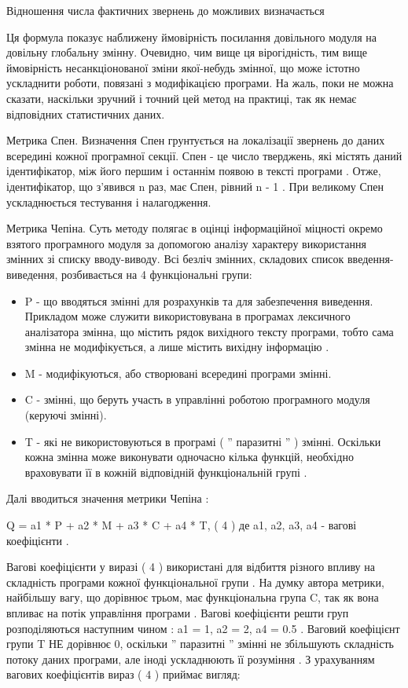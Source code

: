 Відношення числа фактичних звернень до можливих визначається


Ця формула показує наближену ймовірність посилання довільного модуля на довільну глобальну змінну. Очевидно, чим вище ця вірогідність, тим вище ймовірність несанкціонованої зміни якої-небудь змінної, що може істотно ускладнити роботи, пов\dq язані з модифікацією програми. На жаль, поки не можна сказати, наскільки зручний і точний цей метод на практиці, так як немає відповідних статистичних даних.

Метрика Спен.
Визначення Спен грунтується на локалізації звернень до даних всередині кожної програмної секції. Спен - це число тверджень, які містять даний ідентифікатор, між його першим і останнім появою в тексті програми . Отже, ідентифікатор, що з'явився n раз, має Спен, рівний n - 1 . При великому Спен ускладнюється тестування і налагодження.

Метрика Чепіна.
Суть методу полягає в оцінці інформаційної міцності окремо взятого програмного модуля за допомогою аналізу характеру використання змінних зі списку вводу-виводу.
Всі безліч змінних, складових список введення-виведення, розбивається на 4 функціональні групи:

\begin{itemize}
\item P - що вводяться змінні для розрахунків та для забезпечення виведення.
Прикладом може служити використовувана в програмах лексичного аналізатора змінна, що містить рядок вихідного тексту програми, тобто сама змінна не модифікується, а лише містить вихідну інформацію .

\item M - модифікуються, або створювані всередині програми змінні.

\item C - змінні, що беруть участь в управлінні роботою програмного модуля (керуючі змінні).

\item T - які не використовуються в програмі ( '' паразитні '' ) змінні. Оскільки кожна змінна може виконувати одночасно кілька функцій, необхідно враховувати її в кожній відповідній функціональній групі . 
\end{itemize}

Далі вводиться значення метрики Чепіна :

Q = a1 * P + a2 * M + a3 * C + a4 * T, ( 4 )
де a1, a2, a3, a4 - вагові коефіцієнти .

Вагові коефіцієнти у виразі ( 4 ) використані для відбиття різного впливу на складність програми кожної функціональної групи . На думку автора метрики, найбільшу вагу, що дорівнює трьом, має функціональна група C, так як вона впливає на потік управління програми . Вагові коефіцієнти решти груп розподіляються наступним чином : a1 = 1, a2 = 2, a4 = 0.5 . Ваговий коефіцієнт групи T НЕ дорівнює 0, оскільки '' паразитні '' змінні не збільшують складність потоку даних програми, але іноді ускладнюють її розуміння . З урахуванням вагових коефіцієнтів вираз ( 4 ) приймає вигляд:

